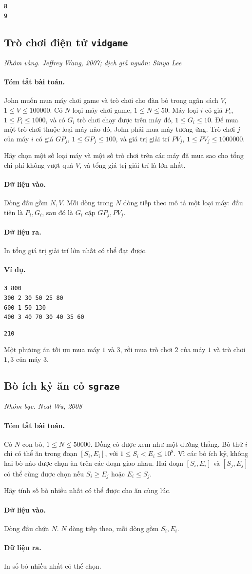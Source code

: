 \documentclass[11pt]{article}
\newcommand{\problem}[4]{%
  \subsection[#1 (#2)]{#1 \hfill {\normalsize\texttt{#2}}}%
  \noindent\textit{#3. #4}\par\smallskip
}
\newcommand{\iosec}[1]{\paragraph{#1}}
\begin{document}
\begin{verbatim}
8
9
\end{verbatim}

\problem{Trò chơi điện tử}{vidgame}{Nhóm vàng}{Jeffrey Wang, 2007; dịch giả nguồn: Sinya Lee}

\iosec{Tóm tắt bài toán.}
John muốn mua máy chơi game và trò chơi cho đàn bò trong ngân sách \(V\),
\(1\le V\le 100000\). Có \(N\) loại máy chơi game, \(1\le N\le 50\). Máy
loại \(i\) có giá \(P_i\), \(1\le P_i\le 1000\), và có \(G_i\) trò chơi chạy
được trên máy đó, \(1\le G_i\le 10\). Để mua một trò chơi thuộc loại máy nào
đó, John phải mua máy tương ứng. Trò chơi \(j\) của máy \(i\) có giá
\(GP_j\), \(1\le GP_j\le 100\), và giá trị giải trí \(PV_j\),
\(1\le PV_j\le 1000000\).

Hãy chọn một số loại máy và một số trò chơi trên các máy đã mua sao cho tổng
chi phí không vượt quá \(V\), và tổng giá trị giải trí là lớn nhất.

\iosec{Dữ liệu vào.}
Dòng đầu gồm \(N,V\). Mỗi dòng trong \(N\) dòng tiếp theo mô tả một loại máy:
đầu tiên là \(P_i,G_i\), sau đó là \(G_i\) cặp \(GP_j,PV_j\).

\iosec{Dữ liệu ra.}
In tổng giá trị giải trí lớn nhất có thể đạt được.

\iosec{Ví dụ.}
\begin{verbatim}
3 800
300 2 30 50 25 80
600 1 50 130
400 3 40 70 30 40 35 60
\end{verbatim}

\begin{verbatim}
210
\end{verbatim}

Một phương án tối ưu mua máy \(1\) và \(3\), rồi mua trò chơi \(2\) của máy
\(1\) và trò chơi \(1,3\) của máy \(3\).

\problem{Bò ích kỷ ăn cỏ}{sgraze}{Nhóm bạc}{Neal Wu, 2008}

\iosec{Tóm tắt bài toán.}
Có \(N\) con bò, \(1\le N\le 50000\). Đồng cỏ được xem như một đường thẳng.
Bò thứ \(i\) chỉ có thể ăn trong đoạn \([S_i,E_i]\), với
\(1\le S_i<E_i\le 10^8\). Vì các bò ích kỷ, không hai bò nào được chọn ăn
trên các đoạn giao nhau. Hai đoạn \([S_i,E_i]\) và \([S_j,E_j]\) có thể cùng
được chọn nếu \(S_i\ge E_j\) hoặc \(E_i\le S_j\).

Hãy tính số bò nhiều nhất có thể được cho ăn cùng lúc.

\iosec{Dữ liệu vào.}
Dòng đầu chứa \(N\). \(N\) dòng tiếp theo, mỗi dòng gồm \(S_i,E_i\).

\iosec{Dữ liệu ra.}
In số bò nhiều nhất có thể chọn.
\end{document}
